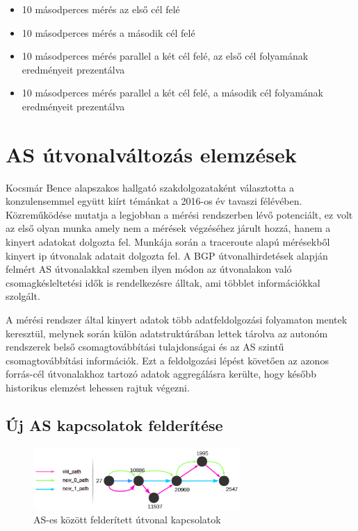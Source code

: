 \begin{itemize}
 \setlength{\parskip}{0pt}
 \setlength{\itemsep}{0pt plus 1pt}
 
\item 10 másodperces mérés az első cél felé
\item 10 másodperces mérés a második cél felé
\item 10 másodperces mérés parallel a két cél felé, az első cél folyamának eredményeit prezentálva
\item 10 másodperces mérés parallel a két cél felé, a második cél folyamának eredményeit prezentálva
\end{itemize}


\section{AS útvonalváltozás elemzések}


Kocsmár Bence alapszakos hallgató szakdolgozataként választotta a konzulensemmel együtt kiírt témánkat a 2016-os év tavaszi félévében. Közreműködése mutatja a legjobban a mérési rendszerben lévő potenciált, ez volt az első olyan munka amely nem a mérések végzéséhez járult hozzá, hanem a kinyert adatokat dolgozta fel. Munkája során a traceroute alapú mérésekből kinyert ip útvonalak adatait dolgozta fel. A BGP útvonalhirdetések alapján felmért AS útvonalakkal szemben ilyen módon az útvonalakon való csomagkésleltetési idők is rendelkezésre álltak, ami többlet információkkal szolgált.

A mérési rendszer által kinyert adatok több adatfeldolgozási folyamaton mentek keresztül, melynek során külön adatstruktúrában lettek tárolva az autonóm rendszerek belső csomagtovábbítási tulajdonságai és az AS szintű csomagtovábbítási információk. Ezt a feldolgozási lépést követően az azonos forrás-cél útvonalakhoz tartozó adatok aggregálásra kerülte, hogy később historikus elemzést lehessen rajtuk végezni.

\subsection{Új AS kapcsolatok felderítése}

\begin{figure}[!ht]
	\centering
	\includegraphics[width=0.70\textwidth, keepaspectratio]{figures/as-path-change-graph.PNG}
	\caption{AS-es között felderített útvonal kapcsolatok}
	\label{fig:as-path-change-graph}
\end{figure}

